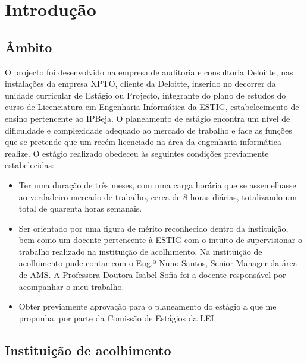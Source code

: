 \chapter{Introdução}
\label{intro}

\section{Âmbito}

\par O projecto foi desenvolvido na empresa de auditoria e consultoria Deloitte, nas instalações da empresa XPTO, cliente da Deloitte, inserido no decorrer da unidade curricular de Estágio ou Projecto, integrante do plano de estudos do curso de Licenciatura em Engenharia Informática da ESTIG, estabelecimento de ensino pertencente ao IPBeja. O planeamento de estágio encontra um nível de dificuldade e complexidade adequado ao mercado de trabalho e face as funções que se pretende que um recém-licenciado na área da engenharia informática realize. O estágio realizado obedeceu às seguintes condições previamente estabelecidas:
\begin{itemize}  \itemsep1pt \parskip0pt 
 \item Ter uma duração de três meses, com uma carga horária que se assemelhasse ao verdadeiro mercado de trabalho, cerca de 8 horas diárias, totalizando um total de quarenta horas semanais.
 \item Ser orientado por uma figura de mérito reconhecido dentro da instituição, bem como um docente pertencente à ESTIG com o intuito de supervisionar o trabalho realizado na instituição de acolhimento. Na instituição de acolhimento pude contar com o Eng.º Nuno Santos, Senior Manager da área de AMS. A Professora Doutora Isabel Sofia foi a docente responsável por acompanhar o meu trabalho.
\item Obter previamente aprovação para o planeamento do estágio a que me propunha, por parte da Comissão de Estágios da LEI.
\end{itemize}
\pagebreak

\section{Instituição de acolhimento}

